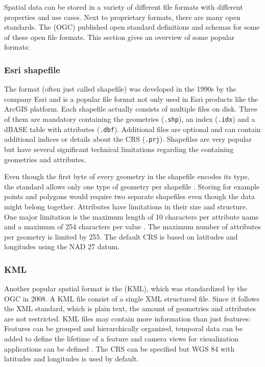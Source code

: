 		Spatial data can be stored in a variety of different file formats with different properties and use cases.
		Next to proprietary formats, there are many open standards.
		The  (OGC) published open standard definitions and schemas for some of these open file formats.		
		This section gives an overview of some popular formats:
		
		\subsubsection{Esri shapefile}
		\label{subsubsec:shapefile}
		
			The  format (often just called shapefile) was developed in the 1990s by the company Esri and is a popular file format not only used in Esri products like the ArcGIS platform.
			Each shapefile actually consists of multiple files on disk\cite{esri-shapefile-file-ext-spec}.
			Three of them are mandatory containing the geometries (\texttt{.shp}), an index (\texttt{.idx}) and a dBASE table with attributes (\texttt{.dbf}).
			Additional files are optional and can contain additional indices or details about the CRS (\texttt{.prj}).
			Shapefiles are very popular\cite{spatial-file-formats-trends} but have several significant technical limitations regarding the containing geometries and attributes.
			
			Even though the first byte of every geometry in the shapefile encodes its type, the standard allows only one type of geometry per shapefile \cite{esri-shapefile-spec}.
			Storing for example points and polygons would require two separate shapefiles even though the data might belong together.
			Attributes have limitations in their size and structure.
			One major limitation is the maximum length of 10 characters per attribute name and a maximum of 254 characters per value \cite{esri-shapefile-limitations}.
			The maximum number of attributes per geometry is limited by 255.
			The default CRS is based on latitudes and longitudes using the NAD 27 datum\cite{esri-shapefile-coordinate-system}.
			
		\subsubsection{KML}
		
			Another popular spatial format is the  (KML), which was standardized by the OGC in 2008\cite{ogc-kml-2.2}.
			A KML file consist of a single XML structured file.
			Since it follows the XML standard, which is plain text, the amount of geometries and attributes are not restricted.
			KML files may contain more information than just features:
			Features can be grouped and hierarchically organized, temporal data can be added to define the lifetime of a feature and camera views for visualization applications can be defined \cite{ogc-kml-2.3}.
			The CRS can be specified but WGS 84 with latitudes and longitudes is used by default.
		
